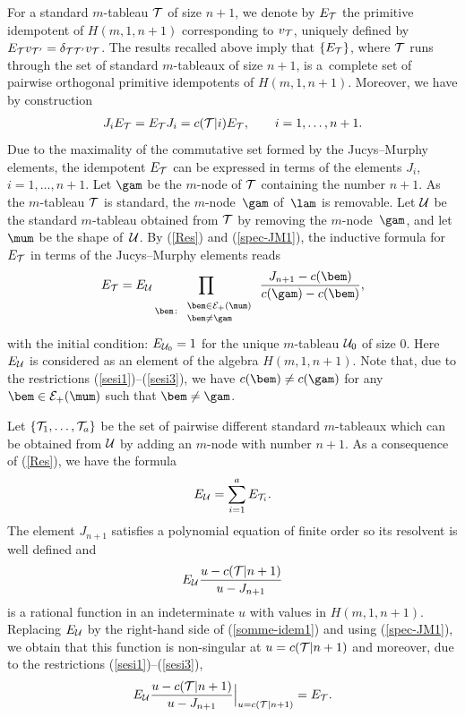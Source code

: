 For a standard $m$-tableau ${\cal{T}}$ of size $n+1$, we denote by $E_{{\cal{T}}}$ the primitive idempotent of $H(m,1,n+1)$ corresponding to $v_{{\cal{T}}}$, uniquely def\/ined by
$E_{{\cal{T}}}v_{{\cal{T'}}}=\delta_{{\cal{T}}{\cal{T'}}}v_{{\cal{T}}}$.
The results recalled above imply that $\{E_{{\cal{T}}}\}$, where ${\cal{T}}$ runs through the set of standard $m$-tableaux of size $n+1$, is a~complete set of pairwise orthogonal primitive idempotents of $H(m,1,n+1)$. Moreover, we have
by construction
\begin{gather}\label{spec-JM1}
J_i E_{{\cal{T}}}=E_{{\cal{T}}}J_i=c({\cal{T}}|i) E_{{\cal{T}}} ,\qquad i=1,\dots,n+1  .
\end{gather}
Due to the maximality of the commutative set formed by the Jucys--Murphy elements, the idempotent $E_{{\cal{T}}}$ can be expressed in terms of the elements $J_i$, $i=1,\dots,n+1$.
Let $\gam$ be the $m$-node of ${\cal{T}}$ containing the number $n+1$. As the $m$-tableau ${\cal{T}}$ is standard, the $m$-node~$\gam$ of~$\lam$ is removable. Let ${\cal{U}}$ be the standard $m$-tableau obtained from ${\cal{T}}$ by removing the $m$-node~$\gam$, and let $\mum$ be the shape of~${\cal{U}}$.
By (\ref{Res}) and (\ref{spec-JM1}), the inductive formula for $E_{{\cal{T}}}$ in terms of the Jucys--Murphy elements reads
\begin{gather*}%
E_{{\cal{T}}}=E_{{\cal{U}}}\prod_{\bem\colon \begin{array}{l}\scriptstyle{\bem\in
{\cal{E}}_+(\mum)}\\[-0.5ex] \scriptstyle{\bem\neq \gam}\end{array}} \frac{J_{n+1}-c(\bem)}{c(\gam)-c(\bem)}  ,
\end{gather*}
with the initial condition: $E_{{\cal{U}}_0}=1$ for the unique $m$-tableau ${\cal{U}}_0$ of size $0$. Here $E_{{\cal{U}}}$ is considered
as an element of the algebra $H(m,1,n+1)$. Note that, due to the restrictions (\ref{sesi1})--(\ref{sesi3}), we have $c(\bem)\neq c(\gam)$ for any $\bem\in {\cal{E}}_+(\mum)$ such that $\bem\neq \gam$.


Let $\{ {\cal{T}}_1,\dots,{\cal{T}}_a\}$ be the set of pairwise dif\/ferent standard $m$-tableaux which can be obtained from ${\cal{U}}$ by adding an $m$-node with number $n+1$.
As a consequence of (\ref{Res}), we have the formula
\begin{gather}\label{somme-idem1}
E_{{\cal{U}}}=\sum_{i=1}^a E_{{\cal{T}}_i} .
\end{gather}
The element $J_{n+1}$ satisf\/ies a polynomial equation of f\/inite order so its resolvent is well def\/ined and
\[ E_{{\cal{U}}}  \frac{u-c({\cal{T}}|n+1)}{u-J_{n+1}}\]
is a rational function in an indeterminate $u$ with values in $H(m,1,n+1)$. Replacing $E_{{\cal{U}}}$ by the right-hand side of (\ref{somme-idem1}) and using (\ref{spec-JM1}), we obtain that this function
is non-singular at $u=c({\cal{T}}|n+1)$ and moreover, due to the restrictions (\ref{sesi1})--(\ref{sesi3}),
\begin{gather}\label{idem-JM-inter1} E_{{\cal{U}}}
\frac{u-c({\cal{T}}|n+1)}{u-J_{n+1}} \Bigr\rvert_{u=c({\cal{T}}|n+1)}=E_{{\cal{T}}} .
\end{gather}

